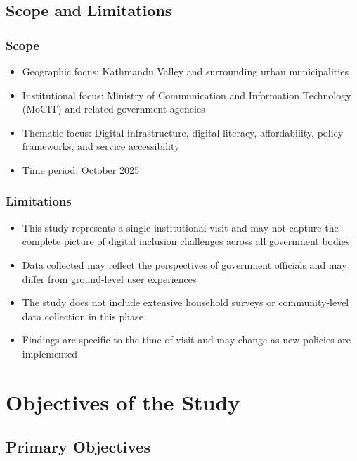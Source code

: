 \documentclass[12pt,a4paper]{article}
\begin{document}
\subsection{Scope and Limitations}

\subsubsection{Scope}

\begin{itemize}
    \item Geographic focus: Kathmandu Valley and surrounding urban municipalities
    \item Institutional focus: Ministry of Communication and Information Technology (MoCIT) and related government agencies
    \item Thematic focus: Digital infrastructure, digital literacy, affordability, policy frameworks, and service accessibility
    \item Time period: October 2025
\end{itemize}

\subsubsection{Limitations}

\begin{itemize}
    \item This study represents a single institutional visit and may not capture the complete picture of digital inclusion challenges across all government bodies
    \item Data collected may reflect the perspectives of government officials and may differ from ground-level user experiences
    \item The study does not include extensive household surveys or community-level data collection in this phase
    \item Findings are specific to the time of visit and may change as new policies are implemented
\end{itemize}

\newpage
\section{Objectives of the Study}
\label{sec:objectives}

\subsection{Primary Objectives}
\end{document}
